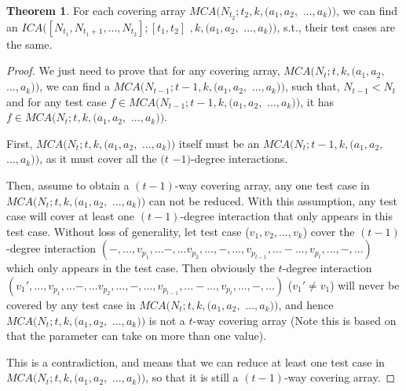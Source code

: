 \documentclass[conference]{IEEEtran}
\theoremstyle{definition}
\newtheorem*{theorem}{Theorem}
\begin{document}
\begin{theorem}
For each covering array $MCA(N_{t_{2}}; t_{2}, k, (a_{1},a_{2},$ $...,a_{k}))$, we can find an $ICA([N_{t_{1}},N_{t_{1} + 1},...,N_{t_{2}}];[t_{1},t_{2}]$ $, k, (a_{1},a_{2},$ $...,a_{k}))$, s.t., their test cases are the same.
\end{theorem}

\begin{proof}
We just need to prove that for any covering array, $MCA(N_{t}; t, k, (a_{1},a_{2},$ $...,a_{k}))$, we can find a $MCA(N_{t-1}; t-1, k, (a_{1},a_{2},$ $...,a_{k}))$, such that, $N_{t-1} < N_{t}$ and for any test case  $f \in MCA(N_{t-1}; t-1, k, (a_{1},a_{2},$ $...,a_{k}))$, it has $f \in MCA(N_{t}; t, k, (a_{1},a_{2},$ $...,a_{k}))$.

 First, $MCA(N_{t}; t, k, (a_{1},a_{2},$ $...,a_{k}))$ itself must be an $MCA(N_{t}; t - 1, k, (a_{1},a_{2},$ $...,a_{k}))$, as it must cover all the $(t$ $ -1)$-degree interactions.

 Then, assume to obtain a $(t-1)$-way covering array, any one test case in $MCA(N_{t}; t, k, (a_{1},a_{2},$ $...,a_{k}))$ can not be reduced. With this assumption, any test case will cover at least one $(t-1)$-degree interaction that only appears in this test case. Without loss of generality,  let test case  ($v_{1}, v_{2}, ..., v_{k}$) cover the $(t-1)$-degree interaction $(-, ..., v_{p_{1}},...-,... v_{p_{2}},...,-, ..., v_{p_{t-1}},...-...,v_{p_{t}},...,-, ...)$ which only appears in the test case. Then obviously the $t$-degree interaction $(v_{1}', ..., v_{p_{1}},...-,... v_{p_{2}},...,-, ..., v_{p_{t-1}},...-...,v_{p_{t}},...,-, ...)$  ($v_{1}' \neq v_{1}$) will never be covered by any test case in $MCA(N_{t}; t, k, (a_{1},a_{2},$ $...,a_{k}))$, and hence $MCA(N_{t}; t, k, (a_{1},a_{2},$ $...,a_{k}))$ is not a $t$-way covering array (Note this is based on that the parameter can take on more than one value).

 This is a contradiction, and means that we can reduce at least one test case in $MCA(N_{t}; t, k, (a_{1},a_{2},$ $...,a_{k}))$, so that it is still a $(t-1)$-way covering array.
\end{proof}
\end{document}
